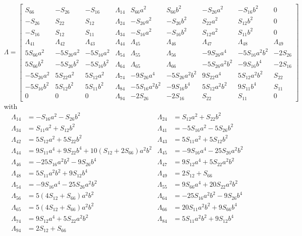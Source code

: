 \documentclass[11pt,a4paper]{article}
\begin{document}
\begin{equation}
\Lambda = \left[
\begin{matrix}
 S_{66} & -S_{26} & -S_{16} & \Lambda_{14} & S_{66} a^2 & S_{66} b^2 & -S_{26} a^2 & -S_{16} b^2 & 0 \\
-S_{26} & S_{22} & S_{12} & \Lambda_{24}  & - S_{26} a^2 & -S_{26} b^2 & S_{22} a^2 & S_{12} b^2 & 0 \\
-S_{16} & S_{12} & S_{11} & \Lambda_{34} & - S_{16} a^2 & -S_{16} b^2 & S_{12} a^2 & S_{11} b^2 & 0 \\
 \Lambda_{41} & \Lambda_{42} & \Lambda_{43} & \Lambda_{44} & \Lambda_{45} & \Lambda_{46} & \Lambda_{47} & \Lambda_{48} & \Lambda_{49} \\
5 S_{66} a^2 & -5 S_{26} a^2 & -5 S_{16} a^2 & \Lambda_{54} & \Lambda_{55} & \Lambda_{56} & -9 S_{26} a^4 & -5 S_{16} a^2 b^2 & - 2 S_{26} \\
5 S_{66} b^2 & -5 S_{26} b^2 & -5 S_{16} b^2 & \Lambda_{64} & \Lambda_{65} & \Lambda_{66} & -5 S_{26} a^2 b^2 & -9 S_{16} b^4 & - 2 S_{16} \\
-5 S_{26} a^2 & 5 S_{22} a^2 & 5 S_{12} a^2 & \Lambda_{74} & -9 S_{26} a^4 & -5 S_{26} a^2 b^2 & 9 S_{22} a^4 & 5 S_{12} a^2 b^2 & S_{22} \\
-5 S_{16} b^2 & 5 S_{12} b^2 & 5 S_{11} b^2 & \Lambda_{84} & -5 S_{16} a^2 b^2 & -9 S_{16} b^4 & 5 S_{12} a^2 b^2 & 9 S_{11} b^4 & S_{11} \\
0 & 0 & 0 & \Lambda_{94} & -2 S_{26} & -2 S_{16} & S_{22} & S_{11} & 0
\end{matrix}
\right]
\end{equation}
with
\begin{align}
\Lambda_{14} &= -S_{16} a^2 -S_{26}b^2 & \Lambda_{24} &= S_{12}a^2 + S_{22}b^2 \nonumber  \\
\Lambda_{34} &= S_{11}a^2 + S_{12}b^2 & \Lambda_{41} &= -5 S_{16}a^2 - 5 S_{26}b^2 \nonumber  \\
\Lambda_{42} &= 5 S_{12}a^2 + 5 S_{22}b^2 & \Lambda_{43} &= 5 S_{11}a^2 + 5 S_{12}b^2 \nonumber \\
\Lambda_{44} &= 9 S_{11} a^4 + 9 S_{22} b^4 + 10 (S_{12}+2 S_{66})a^2 b^2 & 
\Lambda_{45} &= -9 S_{16} a^4 -25 S_{26} a^2 b^2 \nonumber  \\
\Lambda_{46} &= -25 S_{16}a^2b^2 -9 S_{26} b^4 & \Lambda_{47} &= 9 S_{12} a^4 + 5 S_{22} a^2 b^2 \nonumber \\
\Lambda_{48} &= 5 S_{11} a^2 b^2 + 9 S_{12} b^4 & \Lambda_{49} &= 2 S_{12} + S_{66} \nonumber \\
\Lambda_{54} &= -9 S_{16} a^4 -25 S_{26} a^2 b^2 & \Lambda_{55} &= 9 S_{66} a^4 + 20 S_{22} a^2 b^2 \nonumber \\
\Lambda_{56} &= 5(4 S_{12} + S_{66} ) a^2 b^2 & \Lambda_{64} &=  -25 S_{16} a^2 b^2 -9 S_{26} b^4 \nonumber  \\
\Lambda_{65} &= 5(4 S_{12} + S_{66}) a^2 b^2 & \Lambda_{66} &= 20 S_{11} a^2 b^2 + 9 S_{66} b^4 \nonumber \\
\Lambda_{74} &= 9 S_{12} a^4 + 5 S_{22} a^2 b^2 & \Lambda_{84} &= 5 S_{11} a^2 b^2 + 9 S_{12} b^4 \nonumber \\
\Lambda_{94} &=  2 S_{12} + S_{66} & & \nonumber 
\end{align}




\end{document}
